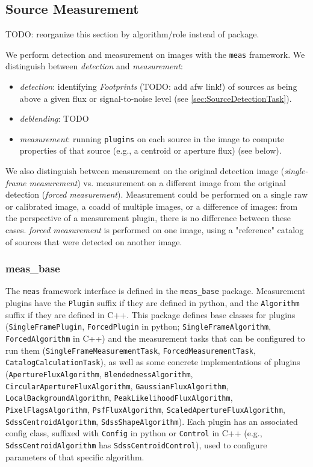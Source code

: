 \subsection{Source Measurement}
\label{sec:measurement}

TODO: reorganize this section by algorithm/role instead of package.

We perform detection and measurement on images with the \texttt{meas} framework.
We distinguish between \textit{detection} and \textit{measurement}:
\begin{itemize}
    \item \textit{detection}: identifying \textit{Footprints} (TODO: add afw link!) of sources as being above a given flux or signal-to-noise level (see \ref{sec:SourceDetectionTask}).
    \item \textit{deblending}: TODO
    \item \textit{measurement}: running \texttt{plugins} on each source in the image to compute properties of that source (e.g., a centroid or aperture flux) (see below).
\end{itemize}

We also distinguish between measurement on the original detection image (\textit{single-frame measurement}) vs. measurement on a different image from the original detection (\textit{forced measurement}).
Measurement could be performed on a single raw or calibrated image, a coadd of multiple images, or a difference of images: from the perspective of a measurement plugin, there is no difference between these cases.
\textit{forced measurement} is performed on one image, using a "reference" catalog of sources that were detected on another image.

\subsubsection{meas\_base}
\label{sec:meas_base}

The \texttt{meas} framework interface is defined in the \texttt{meas\_base} package.
Measurement plugins have the \texttt{Plugin} suffix if they are defined in python, and the \texttt{Algorithm} suffix if they are defined in C++.
This package defines base classes for plugins (\texttt{SingleFramePlugin}, \texttt{ForcedPlugin} in python; \texttt{SingleFrameAlgorithm}, \texttt{ForcedAlgorithm} in C++) and the measurement tasks that can be configured to run them (\texttt{SingleFrameMeasurementTask}, \texttt{ForcedMeasurementTask}, \texttt{CatalogCalculationTask}), as well as some concrete implementations of plugins (\texttt{ApertureFluxAlgorithm}, \texttt{BlendednessAlgorithm}, \texttt{CircularApertureFluxAlgorithm}, \texttt{GaussianFluxAlgorithm}, \texttt{LocalBackgroundAlgorithm}, \texttt{PeakLikelihoodFluxAlgorithm}, \texttt{PixelFlagsAlgorithm}, \texttt{PsfFluxAlgorithm}, \texttt{ScaledApertureFluxAlgorithm}, \texttt{SdssCentroidAlgorithm}, \texttt{SdssShapeAlgorithm}).
Each plugin has an associated config class, suffixed with \texttt{Config} in python or \texttt{Control} in C++ (e.g., \texttt{SdssCentroidAlgorithm} has \texttt{SdssCentroidControl}), used to configure parameters of that specific algorithm.

